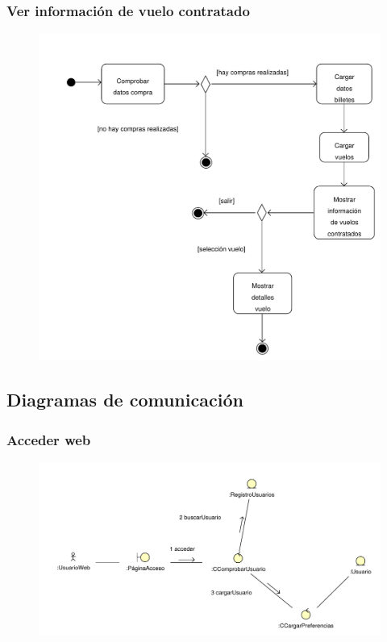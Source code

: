 \documentclass[11pt, a4paper, twoside, titlepage]{article}
\begin{document}
			\subsubsection{Ver información de vuelo contratado}
				\begin{figure}[H]\centering
					\includegraphics[scale=.8]{diagramas/da_verinfovuelocontratado.pdf}
				\end{figure}


		\subsection{Diagramas de comunicación}

			\subsubsection{Acceder web}
				\begin{figure}[H]\centering
					\includegraphics[scale=.75]{diagramas/accederweb.pdf}
				\end{figure}
\end{document}
